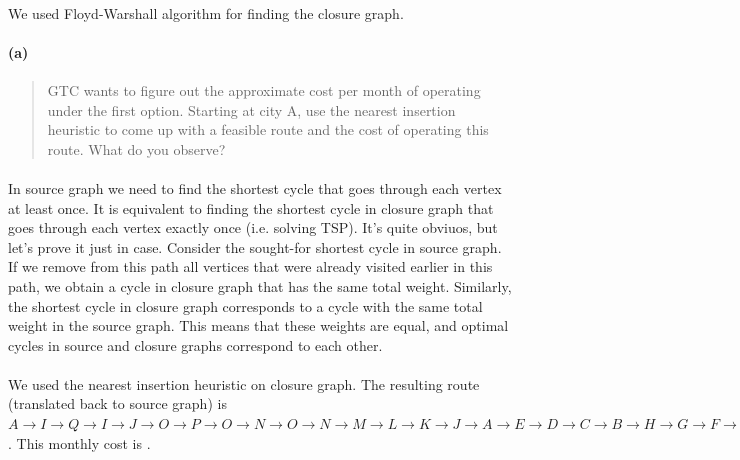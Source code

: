\paragraph{}
We used Floyd-Warshall algorithm for finding the closure graph.

\paragraph{(a)}
\begin{quote}
GTC wants to figure out the approximate cost per month of operating under the first option. Starting at city A, use the nearest insertion heuristic to come up with a feasible route and the cost of operating this route. What do you observe?
\end{quote}

\paragraph{}
In source graph we need to find the shortest cycle that goes through each vertex at least once. It is equivalent to finding the shortest cycle in closure graph that goes through each vertex exactly once (i.e. solving TSP). It's quite obviuos, but let's prove it just in case. Consider the sought-for shortest cycle in source graph. If we remove from this path all vertices that were already visited earlier in this path, we obtain a cycle in closure graph that has the same total weight. Similarly, the shortest cycle in closure graph corresponds to a cycle with the same total weight in the source graph. This means that these weights are equal, and optimal cycles in source and closure graphs correspond to each other.

\paragraph{}
We used the nearest insertion heuristic on closure graph. The resulting route (translated back to source graph) is $ A \rightarrow I \rightarrow Q \rightarrow I \rightarrow J \rightarrow O \rightarrow P \rightarrow O \rightarrow N \rightarrow O \rightarrow N \rightarrow M \rightarrow L \rightarrow K \rightarrow J \rightarrow A \rightarrow E \rightarrow D \rightarrow C \rightarrow B \rightarrow H \rightarrow G \rightarrow F \rightarrow E \rightarrow A $. This monthly cost is .

